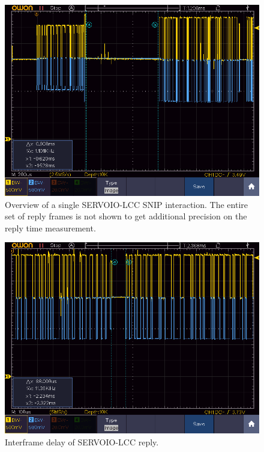 \documentclass[11pt]{article}
\begin{document}
\cbstart
\begin{figure}[!htbp]
\centering
\includegraphics[width=1.0\linewidth]{1SNIP_SPROG_Start_delay_1_140}
\caption{Overview of a single SERVOIO-LCC SNIP interaction.
The entire set of reply frames is not shown to get additional
precision on the reply time measurement.}
\label{fig:single_SERVOIO_SNIP_interaction}
\end{figure}

\begin{figure}[!htbp]
\centering
\includegraphics[width=1.0\linewidth]{1SNIP_SPROG_Interframe_2_900}
\caption{Interframe delay of SERVOIO-LCC reply.}
\label{fig:single_SERVOIO_SNIP_interframe}
\end{figure}
\cbend
\end{document}
